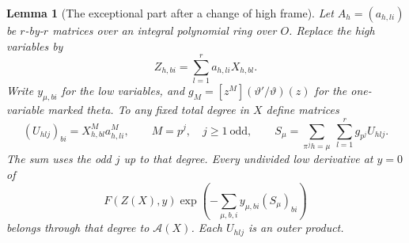 \documentclass[a4paper,11pt]{article}
\newtheorem{lemma}[proposition]{Lemma}
\theoremstyle{definition}
\theoremstyle{remark}
\numberwithin{equation}{section}
\begin{document}
\begin{lemma}[The exceptional part after a change of high frame]\leavevmode
\label{lem:rankoneshift449}
Let \(A_h=(a_{h,li})\) be \(r\)-by-\(r\) matrices over an
integral polynomial ring over \(O\). Replace the high variables by
\[
                 Z_{h,bi}=\sum_{l=1}^r a_{h,li}X_{h,bl}.
\]
Write \(y_{\mu,bi}\) for the low variables, and
\(g_M=[z^M](\vartheta'/\vartheta)(z)\) for the one-variable
marked theta. To any fixed total degree in \(X\) define matrices
\[
 (U_{h l j})_{bi}=X_{h,bl}^{M}a_{h,li}^{M},\qquad M=p^j,\quad
 j\ge1\ \text{odd},\qquad
 S_\mu=\sum_{\pi^j h=\mu}\ \sum_{l=1}^r g_{p^j}U_{h l j}.
\]
The sum uses the odd \(j\) up to that degree. Every undivided
low derivative at \(y=0\) of
\[
 F(Z(X),y)\exp\!\left(-\sum_{\mu,b,i}y_{\mu,bi}(S_\mu)_{bi}\right)
\]
belongs through that degree to \(\mathcal A(X)\). Each
\(U_{h l j}\) is an outer product.
\end{lemma}
\end{document}
